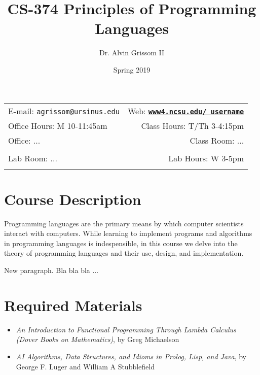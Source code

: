 \documentclass[11pt]{article}
\title{CS-374 Principles of Programming Languages}
\author{Dr. Alvin Grissom II}
\date{Spring 2019}
\newcommand{\blankline}{\quad\pagebreak[2]}
\begin{document}
\maketitle

\blankline

\begin{tabular*}{.93\textwidth}{@{\extracolsep{\fill}}lr}


E-mail: \texttt{agrissom@ursinus.edu} & Web: \href{www4.ncsu.edu/~username}{\tt\bf www4.ncsu.edu/~username}  \\

 Office Hours: M 10-11:45am  &  Class Hours: T/Th 3-4:15pm \\

 Office: ... & Class Room: ... \\
 & \\
Lab Room: ... & Lab Hours: W 3-5pm \\
&  \\
\hline
\end{tabular*}

\vspace{5 mm}


\section*{Course Description}

Programming languages are the primary means by which computer
scientists interact with computers.  While learning to implement
programs and algorithms in programming languages is indespensible, in
this course we delve into the theory of programming languages and
their use, design, and implementation.


\bigskip

\noindent New paragraph. Bla bla bla ...


\section*{Required Materials}

\begin{itemize}
\item \textit{An Introduction to Functional Programming Through Lambda Calculus (Dover Books on Mathematics)}, by Greg Michaelson
\item \textit{AI Algorithms, Data Structures, and Idioms in Prolog, Lisp, and Java}, by George F. Luger and William A Stubblefield
\end{itemize}
\end{document}
